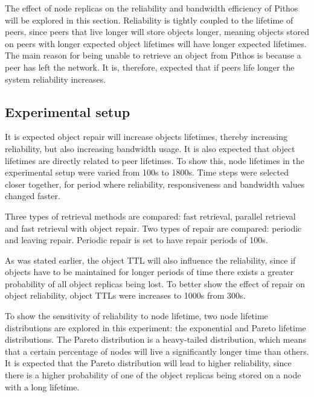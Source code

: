 The effect of node replicas on the reliability and bandwidth efficiency of Pithos will be explored in this section. Reliability is tightly coupled to the lifetime of peers, since peers that live longer will store objects longer, meaning objects stored on peers with longer expected object lifetimes will have longer expected lifetimes. The main reason for being unable to retrieve an object from Pithos is because a peer has left the network. It is, therefore, expected that if peers life longer the system reliability increases.

\subsection{Experimental setup}

It is expected object repair will increase objects lifetimes, thereby increasing reliability, but also increasing bandwidth usage. It is also expected that object lifetimes are directly related to peer lifetimes. To show this, node lifetimes in the experimental setup were varied from 100s to 1800s. Time steps were selected closer together, for period where reliability, responsiveness and bandwidth values changed faster.

Three types of retrieval methods are compared: fast retrieval, parallel retrieval and fast retrieval with object repair. Two types of repair are compared: periodic and leaving repair. Periodic repair is set to have repair periods of 100s.

As was stated earlier, the object TTL will also influence the reliability, since if objects have to be maintained for longer periods of time there exists a greater probability of all object replicas being lost. To better show the effect of repair on object reliability, object TTLs were increases to 1000s from 300s.

To show the sensitivity of reliability to node lifetime, two node lifetime distributions are explored in this experiment: the exponential and Pareto lifetime distributions. The Pareto distribution is a heavy-tailed distribution, which means that a certain percentage of nodes will live a significantly longer time than others. It is expected that the Pareto distribution will lead to higher reliability, since there is a higher probability of one of the object replicas being stored on a node with a long lifetime.

